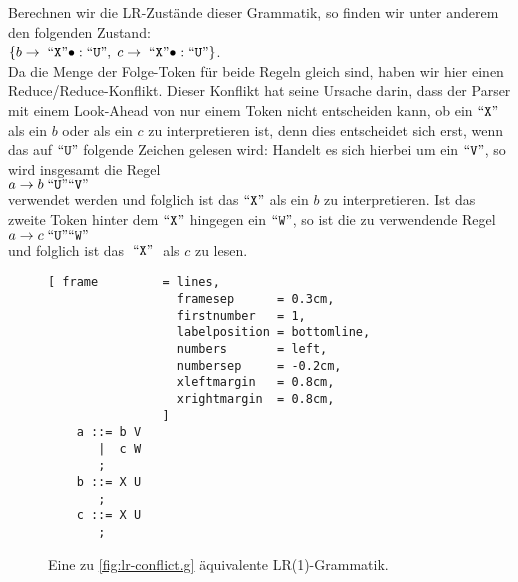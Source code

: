 Berechnen wir die LR-Zust\"ande dieser Grammatik,
so finden wir unter anderem den folgenden Zustand:
\\[0.2cm]
\hspace*{1.3cm}
$\{ b \rightarrow \;\mbox{``\texttt{X}''} \bullet: \mbox{``\texttt{U}''},\; c \rightarrow \;\mbox{``\texttt{X}''} \bullet: \mbox{``\texttt{U}''} \}$.
\\[0.2cm]
Da die Menge der Folge-Token f\"ur beide Regeln gleich sind, haben wir hier einen Reduce/Reduce-Konflikt.
Dieser Konflikt hat seine Ursache darin, dass der Parser mit einem Look-Ahead von nur einem Token nicht
entscheiden kann, ob ein $\mbox{``\texttt{X}''}$ als ein $b$ oder als ein $c$ zu interpretieren ist, denn dies
entscheidet sich erst, wenn das auf $\mbox{``\texttt{U}''}$ folgende Zeichen gelesen wird:  Handelt es sich hierbei
um ein $\mbox{``\texttt{V}''}$, so wird insgesamt die Regel
\\[0.2cm]
\hspace*{1.3cm}
$a \rightarrow b\; \mbox{``\texttt{U}''} \mbox{``\texttt{V}''}$
\\[0.2cm]
verwendet werden und folglich ist das $\mbox{``\texttt{X}''}$ als ein $b$ zu interpretieren. Ist das zweite Token
hinter dem $\mbox{``\texttt{X}''}$ hingegen ein  $\mbox{``\texttt{W}''}$, so ist die zu verwendende Regel
\\[0.2cm]
\hspace*{1.3cm}
$a \rightarrow c \;\mbox{``\texttt{U}''} \mbox{``\texttt{W}''}$
\\[0.2cm]
und folglich ist das $\;\mbox{``\texttt{X}''}\;$ als  $c$ zu lesen.


\begin{figure}[!ht]
\centering
\begin{Verbatim}[ frame         = lines, 
                  framesep      = 0.3cm, 
                  firstnumber   = 1,
                  labelposition = bottomline,
                  numbers       = left,
                  numbersep     = -0.2cm,
                  xleftmargin   = 0.8cm,
                  xrightmargin  = 0.8cm,
                ]
    a ::= b V
       |  c W
       ;
    b ::= X U
       ;
    c ::= X U
       ;
\end{Verbatim}
\vspace*{-0.3cm}
\caption{Eine zu \ref{fig:lr-conflict.g} \"aquivalente LR(1)-Grammatik.}
\label{fig:lr-conflict-resolved.g}
\end{figure}

